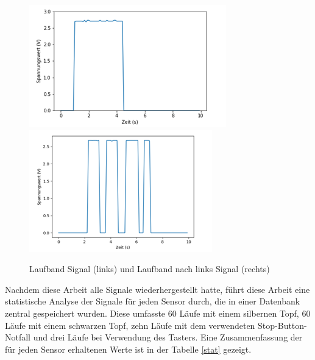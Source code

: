 \documentclass[12pt,a4paper]{scrartcl}
\numberwithin{equation}{section}
\begin{document}
\begin{figure}[ht!]
	\centering
	  \includegraphics[scale=0.75]{laufband.png}
	  \includegraphics[scale=0.75]{laufbandlinks.png}
	  \caption{Laufband Signal (links) und Laufband nach links Signal (rechts)}
	  \label{laufband}
\end{figure}

Nachdem diese Arbeit alle Signale wiederhergestellt hatte, führt diese Arbeit eine statistische Analyse der Signale für jeden Sensor durch, die in einer Datenbank zentral gespeichert wurden. Diese umfasste 60 Läufe mit einem silbernen Topf, 60 Läufe mit einem schwarzen Topf, zehn Läufe mit dem verwendeten Stop-Button-Notfall und drei Läufe bei Verwendung des Tasters.
Eine Zusammenfassung der für jeden Sensor erhaltenen Werte ist in der Tabelle \ref{stat} gezeigt. 
\end{document}

